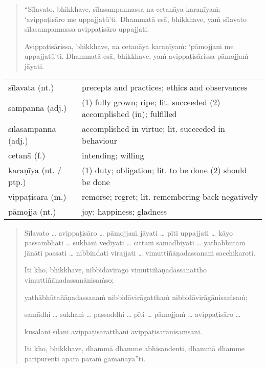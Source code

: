 \documentclass[11pt,oneside]{memoir}
\begin{document}
\begin{quote}
“Sīlavato, bhikkhave, sīlasampannassa na cetanāya karaṇīyaṁ: ‘avippaṭisāro me
uppajjatū’ti. Dhammatā esā, bhikkhave, yaṁ sīlavato sīlasampannassa avippaṭisāro
uppajjati.

Avippaṭisārissa, bhikkhave, na cetanāya karaṇīyaṁ: ‘pāmojjaṁ me uppajjatū’ti.
Dhammatā esā, bhikkhave, yaṁ avippaṭisārissa pāmojjaṁ jāyati.
\end{quote}

\begin{longtable}{L{\colOne} L{\colTwo}}
sīlavata (nt.) & precepts and practices; ethics and observances\\[0pt]
sampanna (adj.) & (1) fully grown; ripe; lit. succeeded (2) accomplished (in); fulfilled\\[0pt]
sīlasampanna (adj.) & accomplished in virtue; lit. succeeded in behaviour\\[0pt]
cetanā (f.) & intending; willing\\[0pt]
karaṇīya (nt. / ptp.) & (1) duty; obligation; lit. to be done (2) should be done\\[0pt]
vippaṭisāra (m.) & remorse; regret; lit. remembering back negatively\\[0pt]
pāmojja (nt.) & joy; happiness; gladness\\[0pt]
\end{longtable}

\begin{quote}
Sīlavato \ldots{}
avippaṭisāro \ldots{}
pāmojjaṁ jāyati \ldots{}
pīti uppajjati \ldots{}
kāyo passambhati \ldots{}
sukhaṁ vediyati \ldots{}
cittaṁ samādhiyati \ldots{}
yathābhūtaṁ jānāti passati \ldots{}
nibbindati virajjati \ldots{}
vimuttiñāṇadassanaṁ sacchikaroti.

Iti kho, bhikkhave, nibbidāvirāgo vimuttiñāṇadassanattho vimuttiñāṇadassanānisaṁso;

yathābhūtañāṇadassanaṁ nibbidāvirāgatthaṁ nibbidāvirāgānisaṁsaṁ;

samādhi \ldots{} sukhaṁ \ldots{} passaddhi \ldots{} pīti \ldots{} pāmojjaṁ \ldots{} avippaṭisāro \ldots{}

kusalāni sīlāni avippaṭisāratthāni avippaṭisārānisaṁsāni.

Iti kho, bhikkhave, dhammā dhamme abhisandenti, dhammā dhamme paripūrenti apārā pāraṁ gamanāyā”ti.
\end{quote}
\end{document}
